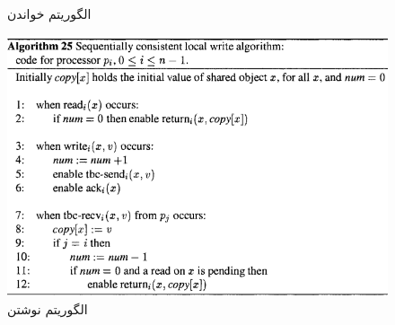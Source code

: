 \documentclass{article}
\begin{document}
\begin{multicols}{2}
\begin{figure}[H]
        \caption{الگوریتم خواندن}
        \label{fig:my_label}
\end{figure}
\begin{figure}[H]
        \centering
        \includegraphics[width=0.8\linewidth]{Photos/HW1/write.PNG}
        \caption{الگوریتم نوشتن}
        \label{fig:my_label}
\end{figure}
\end{multicols}
\end{document}
